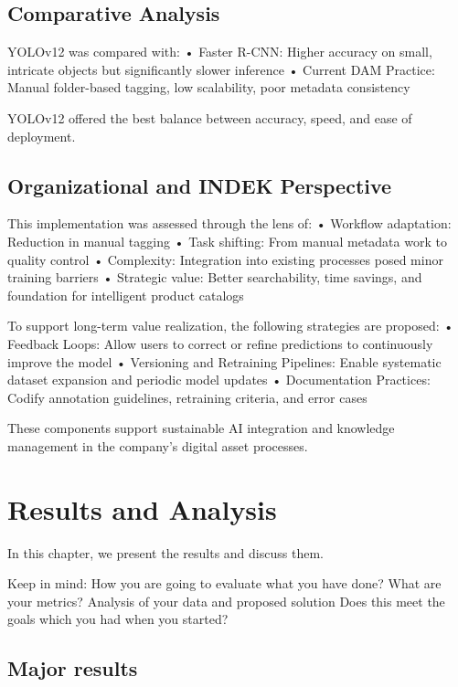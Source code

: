 \documentclass[a4paper,10pt,twocolumn]{article}
\numberwithin{figure}{section}
\numberwithin{table}{section}
\begin{document}
\subsection{Comparative Analysis}
YOLOv12 was compared with:
	•	Faster R-CNN: Higher accuracy on small, intricate objects but significantly slower inference
	•	Current DAM Practice: Manual folder-based tagging, low scalability, poor metadata consistency

YOLOv12 offered the best balance between accuracy, speed, and ease of deployment.


\subsection{Organizational and INDEK Perspective}
This implementation was assessed through the lens of:
	•	Workflow adaptation: Reduction in manual tagging
	•	Task shifting: From manual metadata work to quality control
	•	Complexity: Integration into existing processes posed minor training barriers
	•	Strategic value: Better searchability, time savings, and foundation for intelligent product catalogs

    To support long-term value realization, the following strategies are proposed:
	•	Feedback Loops: Allow users to correct or refine predictions to continuously improve the model
	•	Versioning and Retraining Pipelines: Enable systematic dataset expansion and periodic model updates
	•	Documentation Practices: Codify annotation guidelines, retraining criteria, and error cases

These components support sustainable AI integration and knowledge management in the company’s digital asset processes.


\section{Results and Analysis}
In this chapter, we present the results and discuss them.

Keep in mind: How you are going to evaluate what you have done? What are your metrics?
Analysis of your data and proposed solution
Does this meet the goals which you had when you started?

\subsection{Major results}
\end{document}

